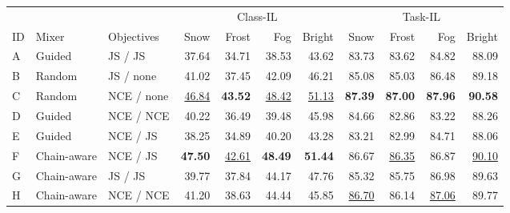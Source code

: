 \begin{center}
\begin{minipage}{\textwidth}
\centering\small
\setlength{\tabcolsep}{6pt}
\begin{tabular}{lllrrrrrrrr}
\toprule
 &  &  & \multicolumn{4}{c}{Class-IL} & \multicolumn{4}{c}{Task-IL} \\
ID & Mixer & Objectives & Snow & Frost & Fog & Bright & Snow & Frost & Fog & Bright \\
\midrule
A & Guided & JS / JS & 37.64 & 34.71 & 38.53 & 43.62 & 83.73 & 83.62 & 84.82 & 88.09 \\
B & Random & JS / none & 41.02 & 37.45 & 42.09 & 46.21 & 85.08 & 85.03 & 86.48 & 89.18 \\
C & Random & NCE / none & \underline{46.84} & \textbf{43.52} & \underline{48.42} & \underline{51.13} & \textbf{87.39} & \textbf{87.00} & \textbf{87.96} & \textbf{90.58} \\
D & Guided & NCE / NCE & 40.22 & 36.49 & 39.48 & 45.98 & 84.66 & 82.86 & 83.22 & 88.26 \\
E & Guided & NCE / JS & 38.25 & 34.89 & 40.20 & 43.28 & 83.21 & 82.99 & 84.71 & 88.06 \\
\rowcolor{ourrow} F & Chain-aware & NCE / JS & \textbf{47.50} & \underline{42.61} & \textbf{48.49} & \textbf{51.44} & 86.67 & \underline{86.35} & 86.87 & \underline{90.10} \\
G & Chain-aware & JS / JS & 39.77 & 37.84 & 44.17 & 47.76 & 85.32 & 85.75 & 86.98 & 89.63 \\
H & Chain-aware & NCE / NCE & 41.20 & 38.63 & 44.44 & 45.85 & \underline{86.70} & 86.14 & \underline{87.06} & 89.77 \\
\bottomrule
\end{tabular}
\end{minipage}
\end{center}
